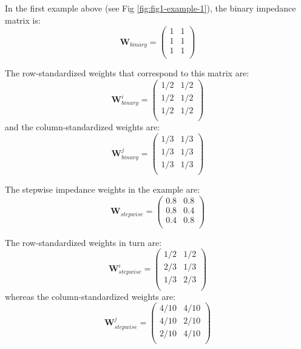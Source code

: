 \documentclass[10pt,letterpaper]{article}
\begin{document}
In the first example above (see Fig \ref{fig:fig1-example-1}), the
binary impedance matrix is: \[
\mathbf{W}_{binary} = \left(\begin{array}{ccc}
            1 & 1\\
            1 & 1\\
            1 & 1\\
        \end{array}
        \right)
\]

The row-standardized weights that correspond to this matrix are: \[
\mathbf{W}^{i}_{binary} = \left(\begin{array}{ccc}
            1/2 & 1/2\\
            1/2 & 1/2\\
            1/2 & 1/2\\
        \end{array}
        \right)
\] and the column-standardized weights are: \[
\mathbf{W}^{j}_{binary} = \left(\begin{array}{ccc}
            1/3 & 1/3\\
            1/3 & 1/3\\
            1/3 & 1/3\\
        \end{array}
        \right)
\]

The stepwise impedance weights in the example are: \[
\mathbf{W}_{stepwise} = \left(\begin{array}{ccc}
            0.8 & 0.8\\
            0.8 & 0.4\\
            0.4 & 0.8\\
        \end{array}
        \right)
\]

The row-standardized weights in turn are: \[
\mathbf{W}^{i}_{stepwise} = \left(\begin{array}{ccc}
            1/2 & 1/2\\
            2/3 & 1/3\\
            1/3 & 2/3\\
        \end{array}
        \right)
\] whereas the column-standardized weights are: \[
\mathbf{W}^{j}_{stepwise} = \left(\begin{array}{ccc}
            4/10 & 4/10\\
            4/10 & 2/10\\
            2/10 & 4/10\\
        \end{array}
        \right)
\]
\end{document}
